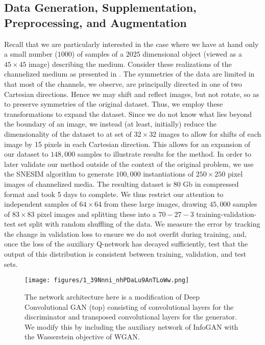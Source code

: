\documentclass{article}
\begin{document}
\subsection{Data Generation, Supplementation, Preprocessing, and Augmentation}\label{aug}
	Recall that we are particularly interested in the case where we have at hand only a small number ($1000$) of samples of a $2025$ dimensional object (viewed as a $45\times45$ image) describing the medium.  Consider these realizations of the channelized medium as presented in \label{intokpca}.  The symmetries of the data are limited in that most of the channels, we observe, are principally directed in one of two Cartesian directions.  Hence we may shift and reflect images, but not rotate, so as to preserve symmetries of the original dataset.  Thus, we employ these transformations to expand the dataset.  Since we do not know what lies beyond the boundary of an image, we instead (at least, initially) reduce the dimensionality of the dataset to at set of $32\times 32$ images to allow for shifts of each image by 15 pixels in each Cartesian direction.  This allows for an expansion of our dataset to $148,000$ samples to illustrate results for the method.  In order to later validate our method outside of the context of the original problem, we use the SNESIM algorithm to generate $100,000$ instantiations of $250\times 250$ pixel images of channelized media.  The resulting dataset is 80 Gb in compressed format and took 5 days to complete. We thus restrict our attention to independent samples of $64 \times 64 $ from these large images, drawing $45,000$ samples of $83\times 83$ pixel images and splitting these into a $70-27-3$ training-validation-test set split with random shuffling of the data.  We measure the error by tracking the change in validation loss to ensure we do not overfit during training, and, once the loss of the auxiliary Q-network has decayed sufficiently, test that the output of this distribution is consistent between training, validation, and test sets. 
\begin{figure}[h]
  \texttt{[image: figures/1\_39Nnni\_nhPDaLu9AnTLoWw.png]}
  \caption{The network architecture here is a modification of Deep Convolutional GAN (top) consisting of convolutional layers for the discriminator and transposed convolutional layers for the generator.  We modify this by including the auxiliary network of InfoGAN with the Wasserstein objective of WGAN.}
\end{figure}\label{nnet}
\end{document}
